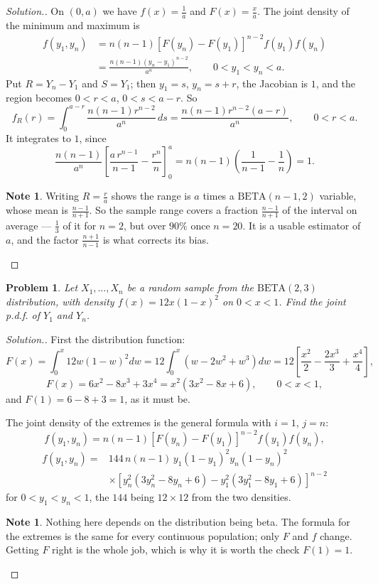 \documentclass[12pt,a4paper]{report}
\theoremstyle{definition}
\newtheorem{note}[thm]{Note}
\theoremstyle{plain}
\newtheorem{problemx}{Problem}[section]
\newenvironment{problem}{\begin{problemx}}{\end{problemx}}
\newenvironment{solution}
  {\renewcommand{\qedsymbol}{}\begin{proof}[\textit{Solution}.]}
  {\end{proof}}
\begin{document}
\begin{solution}
On $(0,a)$ we have $f(x)=\frac1a$ and $F(x)=\frac{x}{a}$. The joint density of the
minimum and maximum is
\begin{align*}
f\left(y_1,y_n\right)&=n(n-1)\left[F(y_n)-F(y_1)\right]^{n-2}f(y_1)f(y_n)\\
&=\frac{n(n-1)\left(y_n-y_1\right)^{n-2}}{a^n},\qquad 0<y_1<y_n<a.
\end{align*}
Put $R=Y_n-Y_1$ and $S=Y_1$; then $y_1=s$, $y_n=s+r$, the Jacobian is $1$, and
the region becomes $0<r<a$, $0<s<a-r$. So
\[f_R(r)=\int_0^{a-r}\frac{n(n-1)r^{n-2}}{a^n}\,ds
=\frac{n(n-1)r^{n-2}(a-r)}{a^n},\qquad 0<r<a.\]
It integrates to $1$, since
\[\frac{n(n-1)}{a^n}\left[\frac{a\,r^{n-1}}{n-1}-\frac{r^n}{n}\right]_0^a
=n(n-1)\left(\frac{1}{n-1}-\frac{1}{n}\right)=1.\]

\begin{note}
Writing $R=\frac{r}{a}$ shows the range is $a$ times a $\text{BETA}(n-1,2)$
variable, whose mean is $\frac{n-1}{n+1}$. So the sample range covers a fraction
$\frac{n-1}{n+1}$ of the interval on average --- $\frac13$ of it for $n=2$, but
over $90\%$ once $n=20$. It is a usable estimator of $a$, and the factor
$\frac{n+1}{n-1}$ is what corrects its bias.
\end{note}
\end{solution}

\begin{problem}
Let $X_1,\ldots,X_n$ be a random sample from the $\text{BETA}(2,3)$ distribution,
with density $f(x)=12x(1-x)^2$ on $0<x<1$. Find the joint p.d.f. of $Y_1$ and
$Y_n$.
\end{problem}

\begin{solution}
First the distribution function:
\[F(x)=\int_0^x12w(1-w)^2dw
=12\int_0^x\left(w-2w^2+w^3\right)dw
=12\left[\frac{x^2}{2}-\frac{2x^3}{3}+\frac{x^4}{4}\right],\]
\[F(x)=6x^2-8x^3+3x^4=x^2\left(3x^2-8x+6\right),\qquad 0<x<1,\]
and $F(1)=6-8+3=1$, as it must be.

The joint density of the extremes is the general formula with $i=1$, $j=n$:
\[f\left(y_1,y_n\right)=n(n-1)\left[F(y_n)-F(y_1)\right]^{n-2}f(y_1)f(y_n),\]
\begin{align*}
f\left(y_1,y_n\right)={}&
144\,n(n-1)\,y_1\left(1-y_1\right)^2y_n\left(1-y_n\right)^2\\
&\times\left[y_n^2\left(3y_n^2-8y_n+6\right)-y_1^2\left(3y_1^2-8y_1+6\right)\right]^{n-2}
\end{align*}
for $0<y_1<y_n<1$, the $144$ being $12\times12$ from the two densities.

\begin{note}
Nothing here depends on the distribution being beta. The formula for the extremes
is the same for every continuous population; only $F$ and $f$ change. Getting $F$
right is the whole job, which is why it is worth the check $F(1)=1$.
\end{note}
\end{solution}
\end{document}
